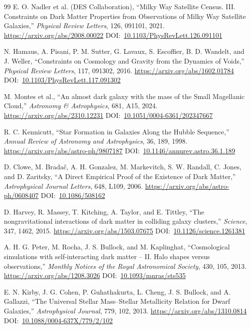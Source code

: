 \documentclass[10pt,onecolumn]{article}
\newcommand{\doi}[1]{DOI:~\href{https://doi.org/#1}{#1}}
\begin{document}
\begin{thebibliography}{99}
E. O. Nadler et al. (DES Collaboration),
``Milky Way Satellite Census. III. Constraints on Dark Matter Properties from Observations of Milky Way Satellite Galaxies,''
\emph{Physical Review Letters}, 126, 091101, 2021.
\url{https://arxiv.org/abs/2008.00022}
\doi{10.1103/PhysRevLett.126.091101}

N. Hamaus, A. Pisani, P. M. Sutter, G. Lavaux, S. Escoffier, B. D. Wandelt, and J. Weller,
``Constraints on Cosmology and Gravity from the Dynamics of Voids,''
\emph{Physical Review Letters}, 117, 091302, 2016.
\url{https://arxiv.org/abs/1602.01784}
\doi{10.1103/PhysRevLett.117.091302}

M. Montes et al.,
``An almost dark galaxy with the mass of the Small Magellanic Cloud,''
\emph{Astronomy \& Astrophysics}, 681, A15, 2024.
\url{https://arxiv.org/abs/2310.12231}
\doi{10.1051/0004-6361/202347667}

R. C. Kennicutt,
``Star Formation in Galaxies Along the Hubble Sequence,''
\emph{Annual Review of Astronomy and Astrophysics}, 36, 189, 1998.
\url{https://arxiv.org/abs/astro-ph/9807187}
\doi{10.1146/annurev.astro.36.1.189}

D. Clowe, M. Brada\v{c}, A. H. Gonzalez, M. Markevitch, S. W. Randall, C. Jones, and D. Zaritsky,
``A Direct Empirical Proof of the Existence of Dark Matter,''
\emph{Astrophysical Journal Letters}, 648, L109, 2006.
\url{https://arxiv.org/abs/astro-ph/0608407}
\doi{10.1086/508162}

D. Harvey, R. Massey, T. Kitching, A. Taylor, and E. Tittley,
``The nongravitational interactions of dark matter in colliding galaxy clusters,''
\emph{Science}, 347, 1462, 2015.
\url{https://arxiv.org/abs/1503.07675}
\doi{10.1126/science.1261381}

A. H. G. Peter, M. Rocha, J. S. Bullock, and M. Kaplinghat,
``Cosmological simulations with self-interacting dark matter -- II. Halo shapes versus observations,''
\emph{Monthly Notices of the Royal Astronomical Society}, 430, 105, 2013.
\url{https://arxiv.org/abs/1208.3026}
\doi{10.1093/mnras/sts535}

E. N. Kirby, J. G. Cohen, P. Guhathakurta, L. Cheng, J. S. Bullock, and A. Gallazzi,
``The Universal Stellar Mass--Stellar Metallicity Relation for Dwarf Galaxies,''
\emph{Astrophysical Journal}, 779, 102, 2013.
\url{https://arxiv.org/abs/1310.0814}
\doi{10.1088/0004-637X/779/2/102}


\end{thebibliography}
\end{document}
